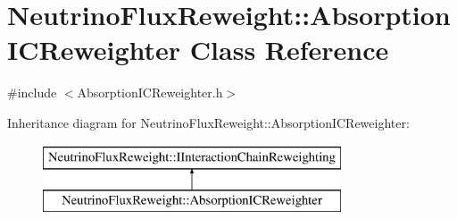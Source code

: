 \hypertarget{class_neutrino_flux_reweight_1_1_absorption_i_c_reweighter}{\section{Neutrino\-Flux\-Reweight\-:\-:Absorption\-I\-C\-Reweighter Class Reference}
\label{class_neutrino_flux_reweight_1_1_absorption_i_c_reweighter}
}


{\ttfamily \#include $<$Absorption\-I\-C\-Reweighter.\-h$>$}

Inheritance diagram for Neutrino\-Flux\-Reweight\-:\-:Absorption\-I\-C\-Reweighter\-:\begin{figure}[H]
\begin{center}
\leavevmode
\includegraphics[height=2.000000cm]{class_neutrino_flux_reweight_1_1_absorption_i_c_reweighter}
\end{center}
\end{figure}
